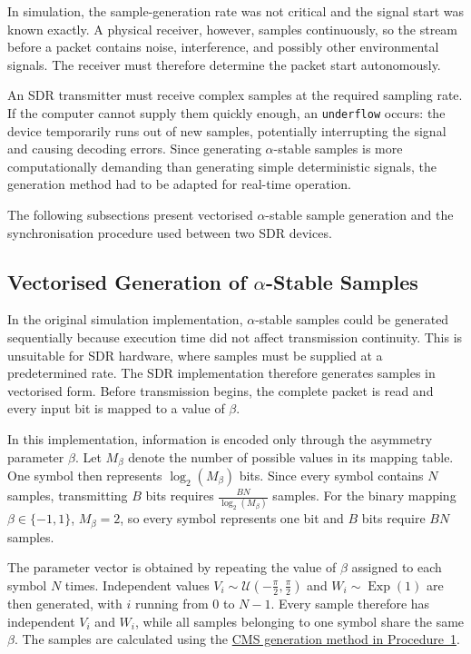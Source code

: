 \documentclass[a4paper, 12pt, openany]{book}
\begin{document}
In simulation, the sample-generation rate was not critical and the signal start was known exactly. A physical receiver, however, samples continuously, so the stream before a packet contains noise, interference, and possibly other environmental signals. The receiver must therefore determine the packet start autonomously.

An SDR transmitter must receive complex samples at the required sampling rate. If the computer cannot supply them quickly enough, an \texttt{underflow} occurs: the device temporarily runs out of new samples, potentially interrupting the signal and causing decoding errors. Since generating $\alpha$-stable samples is more computationally demanding than generating simple deterministic signals, the generation method had to be adapted for real-time operation.

The following subsections present vectorised $\alpha$-stable sample generation and the synchronisation procedure used between two SDR devices.

\subsection{Vectorised Generation of $\alpha$-Stable Samples}

In the original simulation implementation, $\alpha$-stable samples could be generated sequentially because execution time did not affect transmission continuity. This is unsuitable for SDR hardware, where samples must be supplied at a predetermined rate. The SDR implementation therefore generates samples in vectorised form. Before transmission begins, the complete packet is read and every input bit is mapped to a value of $\beta$.

In this implementation, information is encoded only through the asymmetry parameter $\beta$. Let $M_\beta$ denote the number of possible values in its mapping table. One symbol then represents $\log_2(M_\beta)$ bits. Since every symbol contains $N$ samples, transmitting $B$ bits requires $\frac{BN}{\log_2(M_\beta)}$ samples. For the binary mapping $\beta\in\{-1,1\}$, $M_\beta=2$, so every symbol represents one bit and $B$ bits require $BN$ samples.
 
The parameter vector is obtained by repeating the value of $\beta$ assigned to each symbol $N$ times. Independent values $V_i \sim \mathcal{U}\left(-\frac{\pi}{2},\frac{\pi}{2}\right)$ and $W_i \sim \operatorname{Exp}(1)$ are then generated, with $i$ running from $0$ to $N-1$. Every sample therefore has independent $V_i$ and $W_i$, while all samples belonging to one symbol share the same $\beta$. The samples are calculated using the \hyperref[met:cms_generator]{CMS generation method in Procedure~1}.
\end{document}
